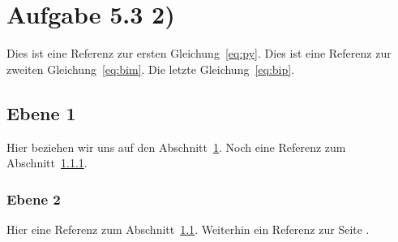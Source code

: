 \documentclass{article}
\begin{document}
\section{Aufgabe 5.3 2)}
\label{sec:0}

Dies ist eine Referenz zur ersten Gleichung~\eqref{eq:py}. Dies ist eine Referenz zur zweiten Gleichung~\eqref{eq:bim}. Die letzte Gleichung~\eqref{eq:bip}.

\subsection{Ebene 1}
\label{sec:1}

Hier beziehen wir uns auf den Abschnitt~\ref{sec:0}. Noch eine Referenz zum Abschnitt~\ref{sec:2}.

\subsubsection{Ebene 2}
\label{sec:2}

Hier eine Referenz zum Abschnitt~\ref{sec:1}. Weiterhin ein Referenz zur Seite \pageref{sec:0}.
\end{document}
